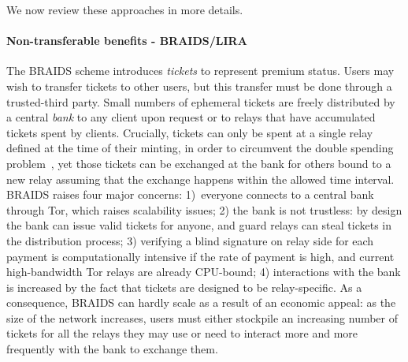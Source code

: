

We now review these approaches in more details. 

\paragraph*{Non-transferable benefits - BRAIDS/LIRA} The BRAIDS scheme
introduces \emph{tickets} to represent premium status. Users may wish
to transfer tickets to other users, but this transfer must be done
through a trusted-third party.  Small numbers of ephemeral tickets are
freely distributed by a central \emph{bank} to any client upon request
or to relays that have accumulated tickets spent by clients. Crucially, tickets can only be spent at a single relay
defined at the time of their minting, in order to circumvent the
double spending problem~\cite{jansen2010recruiting}, yet those tickets
can be exchanged at the bank for others bound to a new relay assuming
that the exchange happens within the allowed time interval. BRAIDS
raises four major concerns: 1)~everyone connects to a central bank
through Tor, which raises scalability issues; 2) the bank is not
trustless: by design the bank can issue valid tickets for anyone, and
guard relays can steal tickets in the distribution process; 3)
verifying a blind signature on relay side for each payment is
computationally intensive if the rate of payment is high, and current
high-bandwidth Tor relays are already CPU-bound; 4) interactions with
the bank is increased by the fact that tickets are designed to be
relay-specific. As a consequence, BRAIDS can hardly scale as a result
of an economic appeal: as the size of the network increases, users
must either stockpile an increasing number of tickets for all the
relays they may use or need to interact more and more frequently with
the bank to exchange them.


